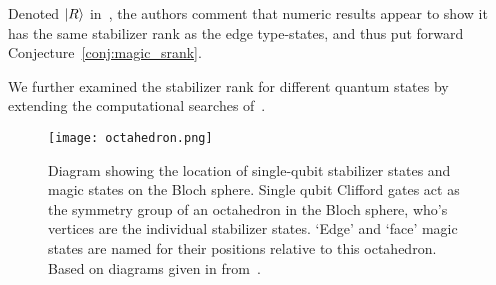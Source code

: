 Denoted $\ket{R}$ in~\cite{Bravyi2015}, the authors comment that numeric results appear to show it has the same stabilizer rank as the edge type-states, and thus put forward Conjecture~\ref{conj:magic_srank}.\par
We further examined the stabilizer rank for different quantum states by extending the computational searches of~\cite{Bravyi2015}.
\begin{figure}[H]
\centering
\texttt{[image: octahedron.png]}
\caption{Diagram showing the location of single-qubit stabilizer states and magic states on the Bloch sphere. Single qubit Clifford gates act as the symmetry group of an octahedron in the Bloch sphere, who's vertices are the individual stabilizer states. `Edge' and `face' magic states are named for their positions relative to this octahedron. Based on diagrams given in from~\cite{Bravyi2005}.}
\end{figure}

